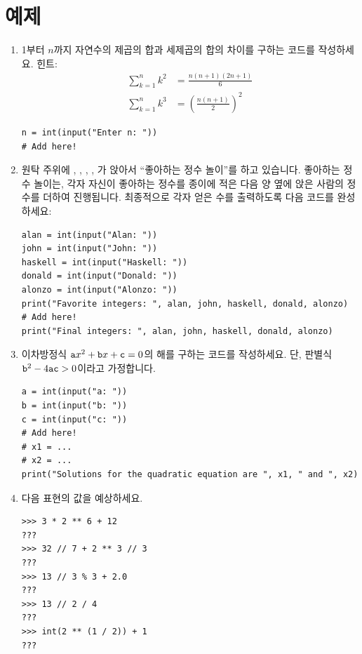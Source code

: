 \documentclass[../main.tex]{subfiles}
\begin{document}
\section{예제}
\begin{enumerate}
  \item 1부터 $n$까지 자연수의 제곱의 합과 세제곱의 합의 차이를 구하는 코드를
    작성하세요.
    힌트:
    \begin{align*}
      \sum^{n}_{k = 1} k^2 &= \frac{n(n + 1)(2n + 1)}{6}\\
      \sum^{n}_{k = 1} k^3 &= \left(\frac{n(n + 1)}{2}\right)^2
    \end{align*}
    \begin{verbatim}
n = int(input("Enter n: "))
# Add here!
    \end{verbatim}

  \item 원탁 주위에 , , , , 가 앉아서 ``좋아하는 정수 놀이''를 하고 있습니다.
    좋아하는 정수 놀이는, 각자 자신이 좋아하는 정수를 종이에 적은 다음 양 옆에 앉은 사람의 정수를 더하여 진행됩니다.
    최종적으로 각자 얻은 수를 출력하도록 다음 코드를 완성하세요:
    \begin{verbatim}
alan = int(input("Alan: "))
john = int(input("John: "))
haskell = int(input("Haskell: "))
donald = int(input("Donald: "))
alonzo = int(input("Alonzo: "))
print("Favorite integers: ", alan, john, haskell, donald, alonzo)
# Add here!
print("Final integers: ", alan, john, haskell, donald, alonzo)
    \end{verbatim}

  \item 이차방정식 $\verb|a|x^2 + \verb|b|x + \verb|c| = 0$의 해를 구하는
    코드를 작성하세요.
    단, 판별식 $\verb|b|^2 - 4\verb|ac| > 0$이라고 가정합니다.

    \begin{verbatim}
a = int(input("a: "))
b = int(input("b: "))
c = int(input("c: "))
# Add here!
# x1 = ...
# x2 = ...
print("Solutions for the quadratic equation are ", x1, " and ", x2)
    \end{verbatim}

  \item 다음 표현의 값을 예상하세요.
    \begin{verbatim}
>>> 3 * 2 ** 6 + 12
???
>>> 32 // 7 + 2 ** 3 // 3
???
>>> 13 // 3 % 3 + 2.0
???
>>> 13 // 2 / 4
???
>>> int(2 ** (1 / 2)) + 1
???
    \end{verbatim}


\end{enumerate}
\end{document}
